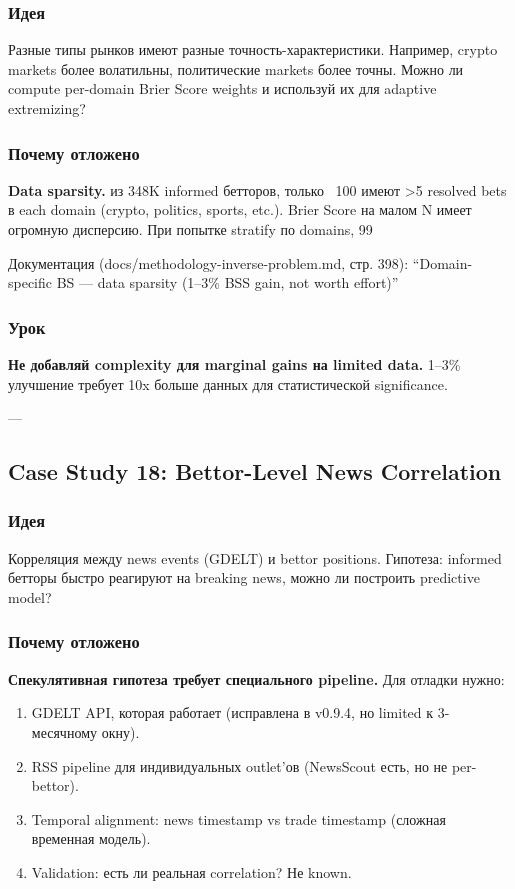 \subsubsection*{Идея}
Разные типы рынков имеют разные точность-характеристики. Например, crypto markets более волатильны, политические markets более точны. Можно ли compute per-domain Brier Score weights и используй их для adaptive extremizing?

\subsubsection*{Почему отложено}
\textbf{Data sparsity.} из 348K informed бетторов, только ~100 имеют >5 resolved bets в each domain (crypto, politics, sports, etc.). Brier Score на малом N имеет огромную дисперсию. При попытке stratify по domains, 99%

Документация (docs/methodology-inverse-problem.md, стр. 398): ``Domain-specific BS --- data sparsity (1--3\% BSS gain, not worth effort)''

\subsubsection*{Урок}
\textbf{Не добавляй complexity для marginal gains на limited data.} 1--3\% улучшение требует 10x больше данных для статистической significance.

---

\subsection{Case Study 18: Bettor-Level News Correlation}

\subsubsection*{Идея}
Корреляция между news events (GDELT) и bettor positions. Гипотеза: informed бетторы быстро реагируют на breaking news, можно ли построить predictive model?

\subsubsection*{Почему отложено}
\textbf{Спекулятивная гипотеза требует специального pipeline.} Для отладки нужно:
\begin{enumerate}
\item GDELT API, которая работает (исправлена в v0.9.4, но limited к 3-месячному окну).
\item RSS pipeline для индивидуальных outlet'ов (NewsScout есть, но не per-bettor).
\item Temporal alignment: news timestamp vs trade timestamp (сложная временная модель).
\item Validation: есть ли реальная correlation? Не known.
\end{enumerate}


